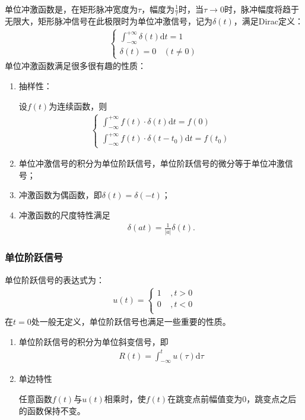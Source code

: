 \documentclass{hitreport}
\begin{document}
单位冲激函数是，在矩形脉冲宽度为$\tau$，幅度为$\frac{1}{\tau}$时，当$\tau\rightarrow 0$时，脉冲幅度将趋于无限大，矩形脉冲信号在此极限时为单位冲激信号，记为$\delta\left(t\right)$，满足Dirac定义：
\begin{align}
\left\{ \begin{array}{l}
	\int_{-\infty}^{+\infty}{\delta\left(t\right)\mathrm{d}t} = 1\\
	\delta \left(t\right) = 0\ \ \ \ \left(t\ne 0\right)
	\end{array} \right.
\end{align}
单位冲激函数满足很多很有趣的性质：
\begin{enumerate}
\item 抽样性：

设$f\left(t\right)$为连续函数，则
\begin{align}
\left\{ \begin{array}{l}
	\int_{-\infty}^{+\infty}{f\left(t\right)\cdot \delta\left(t\right) \mathrm{d}t} = f\left(0\right)\\
	\int_{-\infty}^{+\infty}{f\left(t\right)\cdot \delta\left(t-t_0\right) \mathrm{d}t} = f\left(t_0\right)
	\end{array} \right.
\end{align}

\item 单位冲激信号的积分为单位阶跃信号，单位阶跃信号的微分等于单位冲激信号；

\item 冲激函数为偶函数，即$\delta\left(t\right) = \delta\left(-t\right)$；

\item 冲激函数的尺度特性满足
\begin{align}
\delta\left(at\right) = \frac{1}{\lvert a\rvert}\delta\left(t\right).
\end{align}

\end{enumerate}


\subsubsection{单位阶跃信号}
单位阶跃信号的表达式为：
\begin{align}
	u\left( t \right) =\left\{ \begin{array}{l}
	1 \ \ \ \ \ ,t>0\\
	0 \ \ \ \ \ ,t<0\\
	\end{array} \right.
\end{align}
在$t=0$处一般无定义，单位阶跃信号也满足一些重要的性质。
\begin{enumerate}
\item 单位阶跃信号的积分为单位斜变信号，即
\begin{align}
R\left(t\right) = \int_{-\infty}^{t}{u\left(\tau\right)\mathrm{d}\tau}
\end{align}

\item 单边特性

任意函数$f\left(t\right)$与$u\left(t\right)$相乘时，使$f\left(t\right)$在跳变点前幅值变为0，跳变点之后的函数保持不变。
\end{enumerate}
\end{document}
